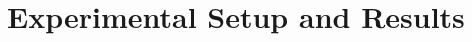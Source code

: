 \documentclass[10pt]{IEEEtran}
\begin{document}













\section{Experimental Setup and Results}
\label{sec:results}
\end{document}
